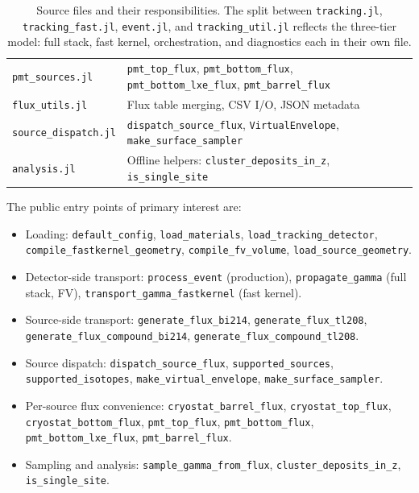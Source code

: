 \documentclass[11pt]{article}
\begin{document}
\begin{table}[h]
\begin{tabular}{ll}
\texttt{pmt\_sources.jl}       & \texttt{pmt\_top\_flux}, \texttt{pmt\_bottom\_flux}, \texttt{pmt\_bottom\_lxe\_flux}, \texttt{pmt\_barrel\_flux} \\
\texttt{flux\_utils.jl}        & Flux table merging, CSV I/O, JSON metadata \\
\texttt{source\_dispatch.jl}   & \texttt{dispatch\_source\_flux}, \texttt{VirtualEnvelope}, \texttt{make\_surface\_sampler} \\
\texttt{analysis.jl}           & Offline helpers: \texttt{cluster\_deposits\_in\_z}, \texttt{is\_single\_site} \\
\bottomrule
\end{tabular}
\caption{Source files and their responsibilities. The split between
\texttt{tracking.jl}, \texttt{tracking\_fast.jl}, \texttt{event.jl}, and
\texttt{tracking\_util.jl} reflects the three-tier model: full stack,
fast kernel, orchestration, and diagnostics each in their own file.}
\label{tab:codemap}
\end{table}

The public entry points of primary interest are:

\begin{itemize}
\item Loading: \texttt{default\_config}, \texttt{load\_materials},
\texttt{load\_tracking\_detector},
\texttt{compile\_fastkernel\_geometry}, \texttt{compile\_fv\_volume},
\texttt{load\_source\_geometry}.
\item Detector-side transport: \texttt{process\_event} (production),
\texttt{propagate\_gamma} (full stack, FV), \texttt{transport\_gamma\_fastkernel}
(fast kernel).
\item Source-side transport: \texttt{generate\_flux\_bi214},
\texttt{generate\_flux\_tl208}, \texttt{generate\_flux\_compound\_bi214},
\texttt{generate\_flux\_compound\_tl208}.
\item Source dispatch: \texttt{dispatch\_source\_flux},
\texttt{supported\_sources}, \texttt{supported\_isotopes},
\texttt{make\_virtual\_envelope}, \texttt{make\_surface\_sampler}.
\item Per-source flux convenience: \texttt{cryostat\_barrel\_flux},
\texttt{cryostat\_top\_flux}, \texttt{cryostat\_bottom\_flux},
\texttt{pmt\_top\_flux}, \texttt{pmt\_bottom\_flux},
\texttt{pmt\_bottom\_lxe\_flux}, \texttt{pmt\_barrel\_flux}.
\item Sampling and analysis: \texttt{sample\_gamma\_from\_flux},
\texttt{cluster\_deposits\_in\_z}, \texttt{is\_single\_site}.
\end{itemize}
\end{document}
